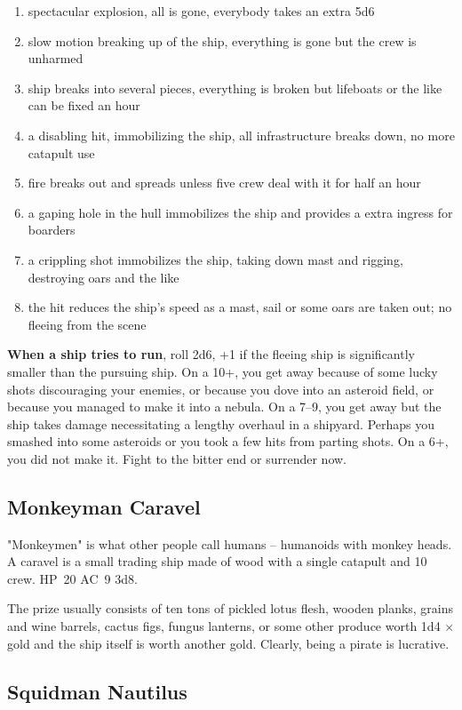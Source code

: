 \documentclass[11pt]{bxart}
\begin{document}
\begin{enumerate}
\item spectacular explosion, all is gone, everybody takes an extra 5d6
\item slow motion breaking up of the ship, everything is gone but the
  crew is unharmed
\item ship breaks into several pieces, everything is broken but
  lifeboats or the like can be fixed an hour
\item a disabling hit, immobilizing the ship, all infrastructure
  breaks down, no more catapult use
\item fire breaks out and spreads unless five crew deal with it for
  half an hour
\item a gaping hole in the hull immobilizes the ship and provides a
  extra ingress for boarders
\item a crippling shot immobilizes the ship, taking down mast and
  rigging, destroying oars and the like
\item the hit reduces the ship's speed as a mast, sail or some oars
  are taken out; no fleeing from the scene
\end{enumerate}

\textbf{When a ship tries to run}, roll 2d6, +1 if the fleeing ship is
significantly smaller than the pursuing ship. On a 10+, you get away
because of some lucky shots discouraging your enemies, or because you
dove into an asteroid field, or because you managed to make it into a
nebula. On a 7--9, you get away but the ship takes damage
necessitating a lengthy overhaul in a shipyard. Perhaps you smashed
into some asteroids or you took a few hits from parting shots. On a
6+, you did not make it. Fight to the bitter end or surrender now.

\subsection{Monkeyman Caravel}

"Monkeymen" is what other people call humans – humanoids with monkey
heads. A caravel is a small trading ship made of wood with a single
catapult and 10 crew. HP~20 AC~9 3d8.

The prize usually consists of ten tons of pickled lotus flesh, wooden
planks, grains and wine barrels, cactus figs, fungus lanterns, or some
other produce worth 1d4 × \unit[10,000]{gold} and the ship itself is worth
another \unit[10,000]{gold}. Clearly, being a pirate is lucrative.

\subsection{Squidman Nautilus}
\end{document}
